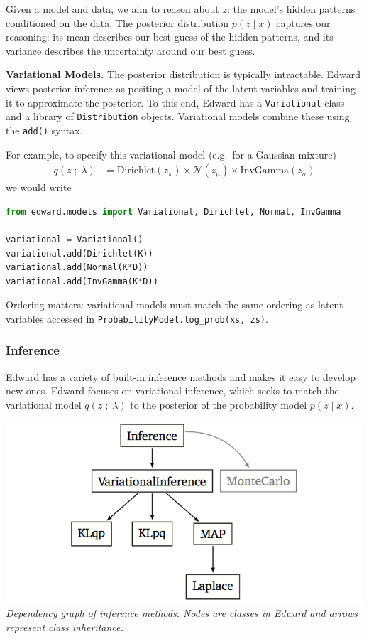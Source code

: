 Given a model and data, we aim to
reason about $z$: the model's hidden patterns conditioned on the data. The
posterior distribution $p(z \mid x)$ captures our reasoning: its mean
describes our best guess of the hidden patterns, and its variance
describes the uncertainty around our best guess.

\textbf{Variational Models.}
The posterior distribution is typically intractable. Edward views
posterior inference as positing a model of the latent variables and
training it to approximate the posterior. To this end, Edward has a
\texttt{Variational} class and a library of \texttt{Distribution}
objects. Variational models combine these using the \texttt{add()}
syntax.

For example, to specify this variational model (e.g.~for a Gaussian mixture)
\begin{align*}
  q(z \;;\; \lambda)
  &=
  \text{Dirichlet}(z_\pi)
  \times
  \mathcal{N}(z_\mu)
  \times
  \text{InvGamma}(z_\sigma)
\end{align*}
we would write
\begin{lstlisting}[language=Python]
from edward.models import Variational, Dirichlet, Normal, InvGamma

variational = Variational()
variational.add(Dirichlet(K))
variational.add(Normal(K*D))
variational.add(InvGamma(K*D))
\end{lstlisting}
Ordering matters: variational models must match the same ordering as latent
variables accessed in \texttt{ProbabilityModel.log_prob(xs, zs)}.

\subsubsection{Inference}\label{inference}

Edward has a variety of built-in inference methods and makes it easy
to develop new ones. Edward focuses on variational inference,
which seeks to match the variational model $q(z \;;\; \lambda)$ to the
posterior of the probability model $p(z \mid x)$.

\includegraphics{images/inference_structure.png}
{\small\textit{Dependency graph of inference methods.
Nodes are classes in Edward and arrows represent class inheritance.}}


